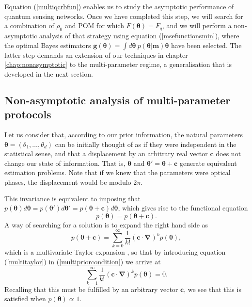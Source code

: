 Equation (\ref{multiqcrbfun}) enables us to study the asymptotic performance of quantum sensing networks. Once we have completed this step, we will search for a combination of $\rho_0$ and POM for which $F(\boldsymbol{\theta}) = F_q$, and we will perform a non-asymptotic analysis of that strategy using equation (\ref{msefunctionsmin}), where the optimal Bayes estimators $\boldsymbol{g}(\boldsymbol{\theta}) = \int d\boldsymbol{\theta}~ p(\boldsymbol{\theta}|\boldsymbol{m})\boldsymbol{\theta}$ have been selected. The latter step demands an extension of our techniques in chapter \ref{chap:nonasymptotic} to the multi-parameter regime, a generalisation that is developed in the next section. 

\subsection{Non-asymptotic analysis of multi-parameter protocols}
\label{subsec:multinonasym}

Let us consider that, according to our prior information, the natural parameters $\boldsymbol{\theta} = (\theta_1, \dots, \theta_d)$ can be initially thought of as if they were independent in the statistical sense, and that a displacement by an arbitrary real vector $\boldsymbol{c}$ does not change our state of information. That is, $\boldsymbol{\theta}$ and $\boldsymbol{\theta}' = \boldsymbol{\theta} + \boldsymbol{c}$ generate equivalent estimation problems. Note that if we knew that the parameters were optical phases, the displacement would be modulo $2\pi$. 

This invariance is equivalent to imposing that $p(\boldsymbol{\theta})d\boldsymbol{\theta} = p(\boldsymbol{\theta}')d\boldsymbol{\theta}'=p(\boldsymbol{\theta}+\boldsymbol{c})d\boldsymbol{\theta}$, which gives rise to the functional equation 
\begin{equation}
p(\boldsymbol{\theta}) = p(\boldsymbol{\theta}+\boldsymbol{c}).
\label{multipriorcondition}
\end{equation}
A way of searching for a solution is to expand the right hand side as
\begin{equation}
p(\boldsymbol{\theta}+\boldsymbol{c}) = \sum_{k=0}^\infty \frac{1}{k!} \left(\boldsymbol{c} \cdot \boldsymbol{\nabla} \right)^k p(\boldsymbol{\theta}),
\label{multitaylor}
\end{equation}
which is a multivariate Taylor expansion \cite{mathematics2004}, so that by introducing equation (\ref{multitaylor}) in (\ref{multipriorcondition}) we arrive at
\begin{equation}
\sum_{k=1}^\infty \frac{1}{k!} \left(\boldsymbol{c} \cdot \boldsymbol{\nabla} \right)^k p(\boldsymbol{\theta}) =0.
\end{equation}
Recalling that this must be fulfilled by an arbitrary vector $\boldsymbol{c}$, we see that this is satisfied when $p(\boldsymbol{\theta}) \propto 1$.

